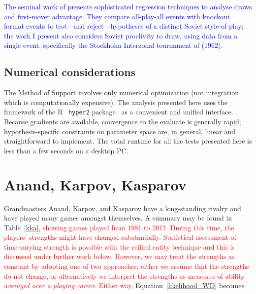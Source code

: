 \documentclass[review]{elsarticle}
\begin{document}
\textcolor{blue}{The seminal work of \citet{moul2009} presents
  sophisticated regression techniques to analyse draws and first-mover
  advantage.  They compare all-play-all events with knockout format
  events to test---and reject---hypotheses of a distinct Soviet
  style-of-play; the work I present also considers Soviet proclivity
  to draw, using data from a single event, specifically the Stockholm
  Interzonal tournament of (1962).}

\subsection{Numerical considerations}

The Method of Support \citep{edwards1972} involves only numerical
optimization (not integration which is computationally expensive).
The analysis presented here uses the framework of the
R~\citep{rcore2019} {\tt hyper2} package~\citep{hankin2017} as a
convenient and unified interface.  Because gradients are available,
convergence to the evaluate is generally rapid; hypothesis-specific
constraints on parameter space are, in general, linear and
straightforward to implement.  The total runtime for all the tests
presented here is less than a few seconds on a desktop PC.

\section{Anand, Karpov, Kasparov}

Grandmasters Anand, Karpov, and Kasparov have a long-standing rivalry
and have played many games amongst themselves.  A summary may be found
in Table~\ref{kka}, \textcolor{red}{showing games played from 1981 to
  2017.  During this time, the players' strengths might have changed
  substantially.  Statistical assessment of time-varying strength is
  possible with the reified entity technique and this is discussed
  under further work below.  However, we may treat the strengths as
  constant by adopting one of two approaches: either we assume that
  the strengths do not change, or alternatively we interpret the
  strengths as measures of ability {\em averaged over a playing
    career}.  Either way,} Equation~\ref{likelihood_WD} becomes
\end{document}
